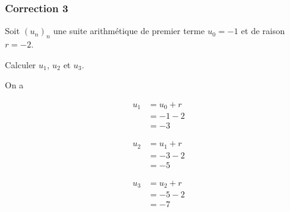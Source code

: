 \documentclass[15pt, mathserif]{beamer}
\begin{document}
\begin{frame}
\vspace{-10mm}
	\frametitle{Correction 3}
Soit $(u_n)_n$ une suite arithmétique de premier terme $u_0=-1$ et de raison $r=-2$. 
 
 Calculer $u_1$, $u_2$ et $u_3$. 
 
 On a 
 \begin{minipage}{0.25\textwidth} 
 
 \begin{align*} 
 u_1 &= u_0+r \\ &= -1-2 \\ &=-3
 \end{align*} 
  
 \end{minipage} \hfil \begin{minipage}{0.25\textwidth} 
 
 \begin{align*} 
 u_2 &= u_1+r \\ &= -3-2 \\ &=-5
 \end{align*} 
 
 \end{minipage} \hfil \begin{minipage}{0.25\textwidth} 
 
 \begin{align*} 
 u_3 &= u_2+r \\ &= -5-2 \\ &=-7
 \end{align*} 
 
 \end{minipage} 
\end{frame}
\end{document}
